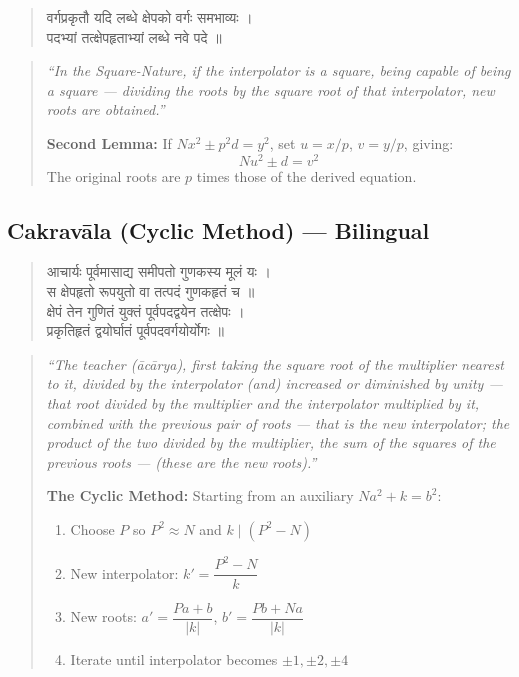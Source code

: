 \documentclass[11pt,a4paper]{article}
\newcommand{\dev}[1]{{\devanagarifont #1}}
\theoremstyle{definition}
\begin{document}
\noindent
\begin{quote}
\dev{वर्गप्रकृतौ यदि लब्धे क्षेपको वर्गः समभाव्यः ।\\
पदभ्यां तत्क्षेपहृताभ्यां लब्धे नवे पदे ॥}
\end{quote}

\hfill\noindent
\begin{quote}
\textit{``In the Square-Nature, if the interpolator is a square, being capable of being a square --- dividing the roots by the square root of that interpolator, new roots are obtained.''}

\textbf{Second Lemma:} If $Nx^2 \pm p^2 d = y^2$, set $u = x/p$, $v = y/p$, giving:
\[Nu^2 \pm d = v^2\]
The original roots are $p$ times those of the derived equation.
\end{quote}



\subsection*{Cakrav\=ala (Cyclic Method) --- Bilingual}



\noindent
\begin{quote}
\dev{आचार्यः पूर्वमासाद्य समीपतो गुणकस्य मूलं यः ।\\
स क्षेपहृतो रूपयुतो वा तत्पदं गुणकहृतं च ॥}\\[0.3cm]
\dev{क्षेपं तेन गुणितं युक्तं पूर्वपदद्वयेन तत्क्षेपः ।\\
प्रकृतिहृतं द्वयोर्घातं पूर्वपदवर्गयोर्योगः ॥}
\end{quote}

\hfill\noindent
\begin{quote}
\textit{``The teacher (\=ac\=arya), first taking the square root of the multiplier nearest to it, divided by the interpolator (and) increased or diminished by unity --- that root divided by the multiplier and the interpolator multiplied by it, combined with the previous pair of roots --- that is the new interpolator; the product of the two divided by the multiplier, the sum of the squares of the previous roots --- (these are the new roots).''}

\textbf{The Cyclic Method:} Starting from an auxiliary $Na^2 + k = b^2$:
\begin{enumerate}
  \item Choose $P$ so $P^2 \approx N$ and $k \mid (P^2 - N)$
  \item New interpolator: $k' = \dfrac{P^2 - N}{k}$
  \item New roots: $a' = \dfrac{Pa + b}{|k|}$, $b' = \dfrac{Pb + Na}{|k|}$
  \item Iterate until interpolator becomes $\pm 1, \pm 2, \pm 4$
\end{enumerate}
\end{quote}
\end{document}
